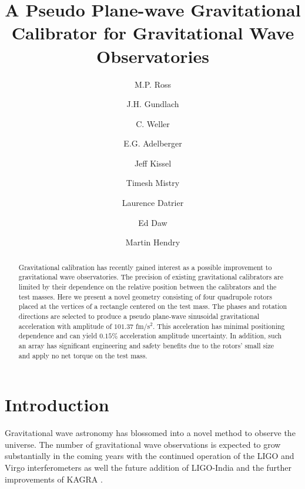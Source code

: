 \documentclass[superscriptaddress, twocolumn, prd]{revtex4-1}
\begin{document}
\title{A Pseudo Plane-wave Gravitational Calibrator for Gravitational Wave Observatories}

\author{M.P. Ross}
\author{J.H. Gundlach}
\author{C. Weller}
\author{E.G. Adelberger}
\author{Jeff Kissel}
\author{Timesh Mistry}
\author{Laurence Datrier}
\author{Ed Daw}
\author{Martin Hendry}



\begin{abstract}

Gravitational calibration has recently gained interest as a possible improvement to gravitational wave observatories. The precision of existing gravitational calibrators are limited by their dependence on the relative position between the calibrators and the test masses. Here we present a novel geometry consisting of four quadrupole rotors placed at the vertices of a rectangle centered on the test mass. The phases and rotation directions are selected to produce a pseudo plane-wave  sinusoidal gravitational acceleration with amplitude of $101.37$ fm/s$^2$. This acceleration has minimal positioning dependence and can yield $0.15 \%$ acceleration amplitude uncertainty. In addition, such an array has significant engineering and safety benefits due to the rotors' small size and apply no net torque on the test mass.

\end{abstract}

\maketitle

\section{Introduction}

Gravitational wave astronomy has blossomed into a novel method to observe the universe. The number of gravitational wave observations is expected to grow substantially in the coming years with the continued operation of the LIGO \cite{aLIGO} and Virgo \cite{virgo} interferometers as well the future addition of LIGO-India \cite{ligo-india} and the further improvements of KAGRA \cite{kagra}. 
\end{document}
